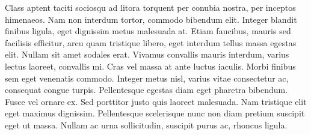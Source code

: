 \documentclass[a4paper,12pt]{report}
\begin{document}
    Class aptent taciti sociosqu ad litora torquent per conubia nostra, per inceptos himenaeos. Nam non interdum tortor, commodo bibendum elit. Integer blandit finibus ligula, eget dignissim metus malesuada at. Etiam faucibus, mauris sed facilisis efficitur, arcu quam tristique libero, eget interdum tellus massa egestas elit. Nullam sit amet sodales erat. Vivamus convallis mauris interdum, varius lectus laoreet, convallis mi. Cras vel massa at ante luctus iaculis. Morbi finibus sem eget venenatis commodo. Integer metus nisl, varius vitae consectetur ac, consequat congue turpis. Pellentesque egestas diam eget pharetra bibendum. Fusce vel ornare ex. Sed porttitor justo quis laoreet malesuada. Nam tristique elit eget maximus dignissim. Pellentesque scelerisque nunc non diam pretium suscipit eget ut massa. Nullam ac urna sollicitudin, suscipit purus ac, rhoncus ligula.
\end{document}
